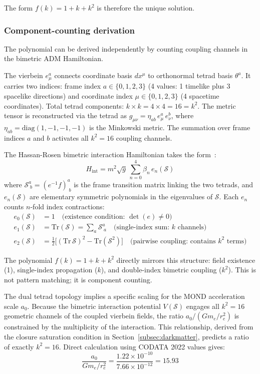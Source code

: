 \documentclass[aps,prd,preprint,superscriptaddress,showpacs,preprintnumbers,amsmath,amssymb,nofootinbib]{revtex4-2}
\begin{document}
The form $f(k) = 1 + k + k^2$ is therefore the unique solution.

\subsubsection*{Component-counting derivation}

The polynomial can be derived independently by counting coupling channels in the bimetric ADM Hamiltonian.

The vierbein $e^a_{\mu}$ connects coordinate basis $dx^{\mu}$ to orthonormal tetrad basis $\theta^a$. It carries two indices: frame index $a \in \{0,1,2,3\}$ (4 values: 1 timelike plus 3 spacelike directions) and coordinate index $\mu \in \{0,1,2,3\}$ (4 spacetime coordinates). Total tetrad components: $k \times k = 4 \times 4 = 16 = k^2$. The metric tensor is reconstructed via the tetrad as $g_{\mu\nu} = \eta_{ab}\, e^a_{\mu}\, e^b_{\nu}$, where $\eta_{ab} = \mathrm{diag}(1,-1,-1,-1)$ is the Minkowski metric. The summation over frame indices $a$ and $b$ activates all $k^2 = 16$ coupling channels.

The Hassan-Rosen bimetric interaction Hamiltonian takes the form~\cite{hassan2012}:
\begin{equation}
H_{\mathrm{int}} = m^2 \sqrt{g}\, \sum_{n=0}^{4} \beta_n\, e_n(\mathcal{S})
\end{equation}
where $\mathcal{S}^a_{\;b} = (e^{-1}f)^a_{\;b}$ is the frame transition matrix linking the two tetrads, and $e_n(\mathcal{S})$ are elementary symmetric polynomials in the eigenvalues of $\mathcal{S}$. Each $e_n$ counts $n$-fold index contractions:
\begin{align}
e_0(\mathcal{S}) &= 1 \quad \text{(existence condition: $\det(e) \neq 0$)} \\
e_1(\mathcal{S}) &= \mathrm{Tr}(\mathcal{S}) = \sum_a \mathcal{S}^a_{\;a} \quad \text{(single-index sum: $k$ channels)} \\
e_2(\mathcal{S}) &= \tfrac{1}{2}\bigl[(\mathrm{Tr}\,\mathcal{S})^2 - \mathrm{Tr}(\mathcal{S}^2)\bigr] \quad \text{(pairwise coupling: contains $k^2$ terms)}
\end{align}

The polynomial $f(k) = 1 + k + k^2$ directly mirrors this structure: field existence (1), single-index propagation ($k$), and double-index bimetric coupling ($k^2$). This is not pattern matching; it is component counting.

The dual tetrad topology implies a specific scaling for the MOND acceleration scale $a_0$. Because the bimetric interaction potential $V(\mathcal{S})$ engages all $k^2 = 16$ geometric channels of the coupled vierbein fields, the ratio $a_0 / (G m_e / r_e^2)$ is constrained by the multiplicity of the interaction. This relationship, derived from the closure saturation condition in Section~\ref{subsec:darkmatter}, predicts a ratio of exactly $k^2 = 16$. Direct calculation using CODATA 2022 values gives:
\begin{equation}
\frac{a_0}{G m_e / r_e^2} = \frac{1.22 \times 10^{-10}}{7.66 \times 10^{-12}} = 15.93
\end{equation}
\end{document}
